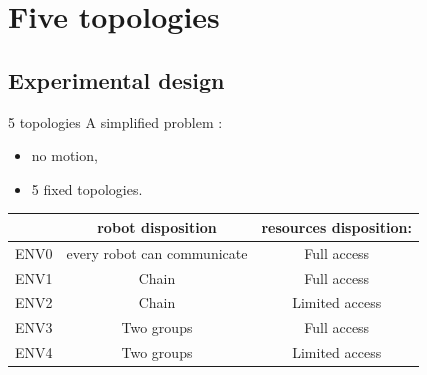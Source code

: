\documentclass[8pt, handout=show,notes=show]{beamer}
\begin{document}


\section{Five topologies}
\subsection{Experimental design}
\begin{frame}{5 topologies}
	A simplified problem :
	\begin{itemize}
		\item no motion,
		\item 5 fixed topologies. 
	\end{itemize}

	\begin{table}[h]
		\begin{tabular}{l|c|c|}
			\scriptsize
			&robot disposition& resources disposition: \\
			\hline
			ENV0 &every robot can communicate& Full access\\\hline
			ENV1 &Chain & Full access\\\hline
			ENV2 &Chain & Limited access \\\hline
			ENV3&Two groups & Full access\\\hline
			ENV4&Two groups & Limited access 
		\end{tabular}
	\end{table}
	

\end{frame}
\end{document}
